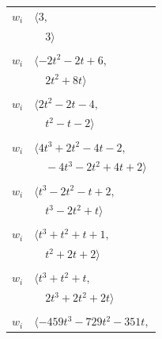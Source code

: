 \documentclass[11pt]{article}
\begin{document}
\begin{longtable}{@{}ll@{}}
$w_i$ & $\langle 3,$\\
 & $\quad 3\rangle$\\
\addlinespace[2pt]
\multicolumn{2}{@{}p{0.97\textwidth}@{}}{$i=7$, $D_i=1$, $\rho_{ij}$: $10{:}2, \allowbreak 13{:}2, \allowbreak 15{:}1, \allowbreak 17{:}1, \allowbreak 19{:}2$}\\
$w_i$ & $\langle -2t^{2}-2t+6,$\\
 & $\quad 2t^{2}+8t\rangle$\\
\addlinespace[2pt]
\multicolumn{2}{@{}p{0.97\textwidth}@{}}{$i=8$, $D_i=3$, $\rho_{ij}$: $9{:}2, \allowbreak 17{:}1$}\\
$w_i$ & $\langle 2t^{2}-2t-4,$\\
 & $\quad t^{2}-t-2\rangle$\\
\addlinespace[2pt]
\multicolumn{2}{@{}p{0.97\textwidth}@{}}{$i=9$, $D_i=1$, $\rho_{ij}$: $8{:}1, \allowbreak 11{:}2, \allowbreak 13{:}2, \allowbreak 17{:}1, \allowbreak 18{:}1, \allowbreak 20{:}1$}\\
$w_i$ & $\langle 4t^{3}+2t^{2}-4t-2,$\\
 & $\quad -4t^{3}-2t^{2}+4t+2\rangle$\\
\addlinespace[2pt]
\multicolumn{2}{@{}p{0.97\textwidth}@{}}{$i=10$, $D_i=1$, $\rho_{ij}$: $4{:}1, \allowbreak 6{:}1, \allowbreak 7{:}1, \allowbreak 12{:}2, \allowbreak 19{:}2, \allowbreak 20{:}2$}\\
$w_i$ & $\langle t^{3}-2t^{2}-t+2,$\\
 & $\quad t^{3}-2t^{2}+t\rangle$\\
\addlinespace[2pt]
\multicolumn{2}{@{}p{0.97\textwidth}@{}}{$i=11$, $D_i=1$, $\rho_{ij}$: $5{:}1, \allowbreak 9{:}1, \allowbreak 19{:}2$}\\
$w_i$ & $\langle t^{3}+t^{2}+t+1,$\\
 & $\quad t^{2}+2t+2\rangle$\\
\addlinespace[2pt]
\multicolumn{2}{@{}p{0.97\textwidth}@{}}{$i=12$, $D_i=1$, $\rho_{ij}$: $2{:}1, \allowbreak 10{:}1, \allowbreak 14{:}1, \allowbreak 17{:}2, \allowbreak 18{:}1$}\\
$w_i$ & $\langle t^{3}+t^{2}+t,$\\
 & $\quad 2t^{3}+2t^{2}+2t\rangle$\\
\addlinespace[2pt]
\multicolumn{2}{@{}p{0.97\textwidth}@{}}{$i=13$, $D_i=9$, $e_i=1$, $\rho_{ij}$: $1{:}2, \allowbreak 7{:}1, \allowbreak 9{:}1, \allowbreak 16{:}2, \allowbreak 19{:}2, \allowbreak 20{:}1$}\\
$w_i$ & $\langle -459t^{3}-729t^{2}-351t,$\\

\end{longtable}
\end{document}
